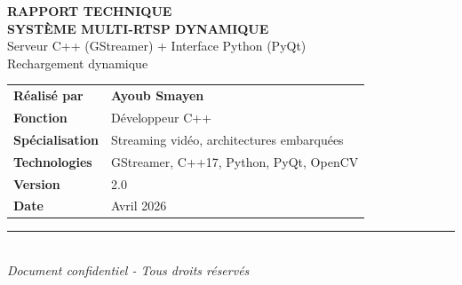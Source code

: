 \documentclass[12pt,a4paper]{report}
\begin{document}
\begin{titlepage}
    \centering
    \vspace*{1cm}
    
    
    \vspace{2cm}
    
    {\Huge\bfseries\color{primaryBlue} RAPPORT TECHNIQUE\\[0.3cm]}
    {\huge\bfseries SYSTÈME MULTI-RTSP DYNAMIQUE\\[0.5cm]}
    {\Large Serveur C++ (GStreamer) + Interface Python (PyQt)\\[0.3cm]
     Rechargement dynamique}
    
    \vspace{2cm}
    
    \begin{tcolorbox}[colback=lightGray!30, colframe=primaryBlue, width=0.7\textwidth, sharp corners]
        \begin{tabular}{p{3cm}p{8cm}}
            \textbf{Réalisé par} & \textbf{Ayoub Smayen} \\
            \textbf{Fonction} & Développeur C++ \\
            \textbf{Spécialisation} & Streaming vidéo, architectures embarquées \\
            \textbf{Technologies} & GStreamer, C++17, Python, PyQt, OpenCV \\
            \textbf{Version} & 2.0 \\
            \textbf{Date} & Avril 2026 \\
        \end{tabular}
    \end{tcolorbox}
    
    \vfill
    
    \begin{center}
        \rule{0.8\textwidth}{0.5pt}\\
        \textit{Document confidentiel - Tous droits réservés}
    \end{center}
\end{titlepage}
\end{document}
